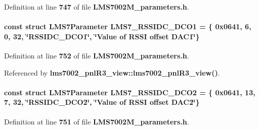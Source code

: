 Definition at line {\bf 747} of file {\bf L\+M\+S7002\+M\+\_\+parameters.\+h}.

\paragraph[{L\+M\+S7\+\_\+\+R\+S\+S\+I\+D\+C\+\_\+\+D\+C\+O1}]{\setlength{\rightskip}{0pt plus 5cm}const struct {\bf L\+M\+S7\+Parameter} L\+M\+S7\+\_\+\+R\+S\+S\+I\+D\+C\+\_\+\+D\+C\+O1 = \{ 0x0641, 6, 0, 32, \char`\"{}\+R\+S\+S\+I\+D\+C\+\_\+\+D\+C\+O1\char`\"{}, \char`\"{}\+Value of R\+S\+S\+I offset D\+A\+C1\char`\"{}\}\hspace{0.3cm}{\ttfamily [static]}}\label{LMS7002M__parameters_8h_a58d8ee934f6e61eafd52d89e640b7aed}


Definition at line {\bf 752} of file {\bf L\+M\+S7002\+M\+\_\+parameters.\+h}.



Referenced by {\bf lms7002\+\_\+pnl\+R3\+\_\+view\+::lms7002\+\_\+pnl\+R3\+\_\+view()}.

\paragraph[{L\+M\+S7\+\_\+\+R\+S\+S\+I\+D\+C\+\_\+\+D\+C\+O2}]{\setlength{\rightskip}{0pt plus 5cm}const struct {\bf L\+M\+S7\+Parameter} L\+M\+S7\+\_\+\+R\+S\+S\+I\+D\+C\+\_\+\+D\+C\+O2 = \{ 0x0641, 13, 7, 32, \char`\"{}\+R\+S\+S\+I\+D\+C\+\_\+\+D\+C\+O2\char`\"{}, \char`\"{}\+Value of R\+S\+S\+I offset D\+A\+C2\char`\"{}\}\hspace{0.3cm}{\ttfamily [static]}}\label{LMS7002M__parameters_8h_ab96095ca45641ccb1ebe6bc388a43078}


Definition at line {\bf 751} of file {\bf L\+M\+S7002\+M\+\_\+parameters.\+h}.



